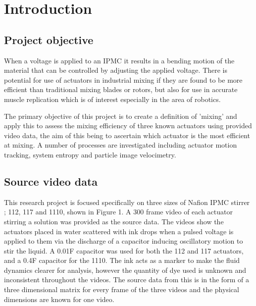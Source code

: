 
\section{Introduction}
\label{sec:Introduction}

\subsection{Project objective}

When a voltage is applied to an IPMC it results in a bending motion of the material that can be controlled by adjusting the applied voltage. There is potential for use of actuators in industrial mixing if they are found to be more efficient than traditional mixing blades or rotors, but also for use in accurate muscle replication which is of interest especially in the area of robotics.


The primary objective of this project is to create a definition of 'mixing' and apply this to assess the mixing efficiency of three known actuators using provided video data, the aim of this being to ascertain which actuator is the most efficient at mixing. A number of processes are investigated including actuator motion tracking, system entropy and particle image velocimetry.



\subsection{Source video data}

This research project is focused specifically on three sizes of Nafion IPMC stirrer \cite{dupont}; 112, 117 and 1110, shown in Figure 1. A 300 frame video of each actuator stirring a solution was provided as the source data. The videos show the actuators placed in water scattered with ink drops when a pulsed voltage is applied to them via the discharge of a capacitor inducing oscillatory motion to stir the liquid. A 0.01F capacitor was used for both the 112 and 117 actuators, and a 0.4F capacitor for the 1110. The ink acts as a marker to make the fluid dynamics clearer for analysis, however the quantity of dye used is unknown and inconsistent throughout the videos. The source data from this is in the form of a three dimensional matrix for every frame of the three videos and the physical dimensions are known for one video.


